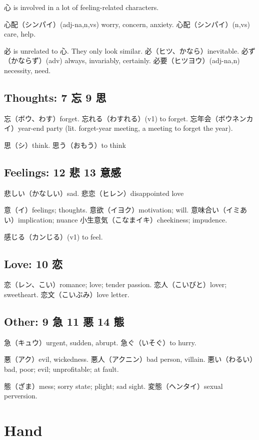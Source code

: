 心 is involved in a lot of feeling-related characters.

心配（シンパイ）(adj-na,n,vs) worry, concern, anxiety.
心配（シンパイ）(n,vs) care, help.

必 is unrelated to 心. They only look similar.
必（ヒツ、かなら）inevitable.
必ず（かならず）(adv) always, invariably, certainly.
必要（ヒツヨウ）(adj-na,n) necessity, need.

\subsection{Thoughts: 7 忘 9 思}

忘（ボウ、わす）forget.
忘れる（わすれる）(v1) to forget.
忘年会（ボウネンカイ）year-end party
(lit. forget-year meeting, a meeting to forget the year).

思（シ）think.
思う（おもう）to think

\subsection{Feelings: 12 悲 13 意感}

悲しい（かなしい）sad.
悲恋（ヒレン）disappointed love

意（イ）feelings; thoughts.
意欲（イヨク）motivation; will.
意味合い（イミあい）implication; nuance
小生意気（こなまイキ）cheekiness; impudence.

感じる（カンじる）(v1) to feel.

\subsection{Love: 10 恋}

恋（レン、こい）romance; love; tender passion.
恋人（こいびと）lover; sweetheart.
恋文（こいぶみ）love letter.

\subsection{Other: 9 急 11 悪 14 態}

急（キュウ）urgent, sudden, abrupt.
急ぐ（いそぐ）to hurry.

悪（アク）evil, wickedness.
悪人（アクニン）bad person, villain.
悪い（わるい）bad, poor; evil; unprofitable; at fault.

態（ざま）mess; sorry state; plight; sad sight.
変態（ヘンタイ）sexual perversion.

\section{Hand}

